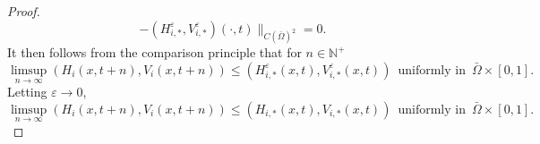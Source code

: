 \documentclass[11pt,reqno]{amsart}
\numberwithin{equation}{section}
\begin{document}
\begin{proof}
\begin{equation*}
- (H_{i,*}^{\varepsilon},V_{i,*}^{\varepsilon})(\cdot,t)  \|_{{C(\bar{\Omega})}^{2}} = 0.
\end{equation*}
It then follows from the comparison principle that for $n\in\mathbb{N}^{+}$
\begin{equation*}
\limsup_{n\to\infty} (H_{i}(x,t+n),V_{i}(x,t+n) ) \leq
(H_{i,*}^{\varepsilon}(x,t),V_{i,*}^{\varepsilon}(x,t))
\enspace \text{uniformly in} \enspace \bar{\Omega}\times[0,1].
\end{equation*}
Letting $\varepsilon\to 0$,
\begin{equation*}\label{6.15}
\limsup_{n\to\infty} (H_{i}(x,t+n),V_{i}(x,t+n)) \leq
(H_{i,*}(x,t),V_{i,*}(x,t))
\enspace \text{uniformly in} \enspace \bar{\Omega}\times[0,1].
\end{equation*}


\end{proof}
\end{document}
